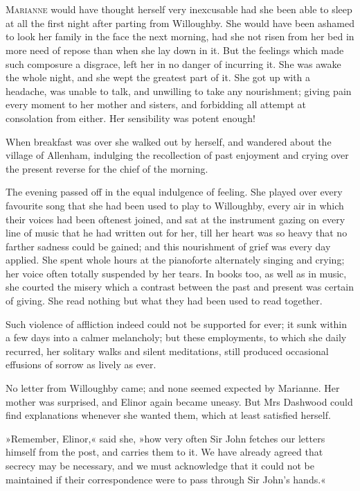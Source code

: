 \chapter[Chapter \thechapter]{}
\lettrine[lines=4,lraise=0.3]{M}{arianne} would have thought herself very inexcusable had she been able to sleep at all the first night after parting from Willoughby. She would have been ashamed to look her family in the face the next morning, had she not risen from her bed in more need of repose than when she lay down in it. But the feelings which made such composure a disgrace, left her in no danger of incurring it. She was awake the whole night, and she wept the greatest part of it. She got up with a headache, was unable to talk, and unwilling to take any nourishment; giving pain every moment to her mother and sisters, and forbidding all attempt at consolation from either. Her sensibility was potent enough!

When breakfast was over she walked out by herself, and wandered about the village of Allenham, indulging the recollection of past enjoyment and crying over the present reverse for the chief of the morning.

The evening passed off in the equal indulgence of feeling. She played over every favourite song that she had been used to play to Willoughby, every air in which their voices had been oftenest joined, and sat at the instrument gazing on every line of music that he had written out for her, till her heart was so heavy that no farther sadness could be gained; and this nourishment of grief was every day applied. She spent whole hours at the pianoforte alternately singing and crying; her voice often totally suspended by her tears. In books too, as well as in music, she courted the misery which a contrast between the past and present was certain of giving. She read nothing but what they had been used to read together.

Such violence of affliction indeed could not be supported for ever; it sunk within a few days into a calmer melancholy; but these employments, to which she daily recurred, her solitary walks and silent meditations, still produced occasional effusions of sorrow as lively as ever.

No letter from Willoughby came; and none seemed expected by Marianne. Her mother was surprised, and Elinor again became uneasy. But Mrs Dashwood could find explanations whenever she wanted them, which at least satisfied herself.

»Remember, Elinor,« said she, »how very often Sir John fetches our letters himself from the post, and carries them to it. We have already agreed that secrecy may be necessary, and we must acknowledge that it could not be maintained if their correspondence were to pass through Sir John’s hands.«

